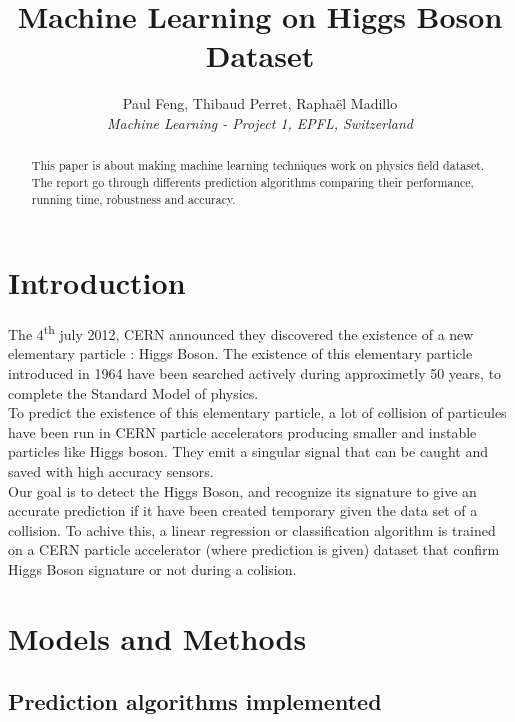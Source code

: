 \documentclass[10pt,conference,compsocconf]{IEEEtran}
\begin{document}
\title{Machine Learning on Higgs Boson Dataset}

\author{
  Paul Feng, Thibaud Perret, Raphaël Madillo\\
  \textit{Machine Learning - Project 1, EPFL, Switzerland}
}

\maketitle

\begin{abstract}
This paper is about making machine learning techniques work on physics field dataset. 
The report go through differents prediction algorithms comparing their performance, running time, robustness and accuracy.  

\end{abstract}

\section{Introduction}

The 4\textsuperscript{th} july 2012, CERN announced they discovered the existence of a new elementary particle : Higgs Boson. The existence of this elementary particle introduced in 1964 have been searched actively during approximetly 50 years, to complete the Standard Model of physics.\\  
To predict the existence of this elementary particle, a lot of collision of particules have been run in CERN particle accelerators producing smaller and instable particles like Higgs boson. They emit a singular signal that can be caught and saved with high accuracy sensors.\\
Our goal is to detect the Higgs Boson, and recognize its signature to give an accurate prediction if it have been created temporary given the data set of a collision. To achive this, a linear regression or classification algorithm is trained on a CERN particle accelerator (where prediction is given) dataset that confirm Higgs Boson signature or not during a colision.\\

\section{Models and Methods}
\subsection{Prediction algorithms implemented}
\label{sec:structure-paper}
\end{document}
